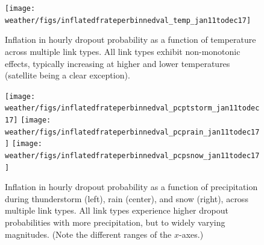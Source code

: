 


\begin{figure}[t]
\centering
\texttt{[image: weather/figs/inflatedfrateperbinnedval\_temp\_jan11todec17]}
\caption[Inflation in hourly dropout probability as a function of
temperature across link types]{
\label{fig:temp_cont}
\figdone
Inflation in hourly dropout probability as a function of temperature 
	across multiple link types. All link types exhibit non-monotonic
	effects, typically increasing at higher and lower temperatures
	(satellite being a clear exception).
}
\end{figure}

\newlength{\triplefigwidth}
\setlength{\triplefigwidth}{2.3in}
\begin{figure}[t]
\centering
\texttt{[image: weather/figs/inflatedfrateperbinnedval\_pcptstorm\_jan11todec17]}%
%
\hfill
%
\texttt{[image: weather/figs/inflatedfrateperbinnedval\_pcprain\_jan11todec17]}%
%
\hfill
%
\texttt{[image: weather/figs/inflatedfrateperbinnedval\_pcpsnow\_jan11todec17]}
\caption[Inflation in hourly dropout probability as a function of
different types of precipitation across link types]{
\label{fig:pcp_cont} Inflation in hourly dropout probability as a
	function of precipitation during thunderstorm (left), rain
	(center), and snow (right), across multiple link types. All link
	types experience higher dropout probabilities with more
	precipitation, but to widely varying magnitudes. (Note the
	different ranges of the $x$-axes.)}
\end{figure}



